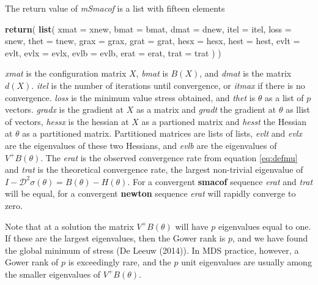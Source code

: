 \documentclass[
  12pt,
]{article}
\newenvironment{Shaded}{\begin{snugshade}}{\end{snugshade}}
\newcommand{\AttributeTok}[1]{\textcolor[rgb]{0.13,0.29,0.53}{#1}}
\newcommand{\FunctionTok}[1]{\textcolor[rgb]{0.13,0.29,0.53}{\textbf{#1}}}
\newcommand{\NormalTok}[1]{#1}
\begin{document}
The return value of \emph{mSmacof} is a list with fifteen elements

\begin{Shaded}
\begin{Highlighting}[]
    \FunctionTok{return}\NormalTok{(}
      \FunctionTok{list}\NormalTok{(}
        \AttributeTok{xmat =}\NormalTok{ xnew,}
        \AttributeTok{bmat =}\NormalTok{ bmat,}
        \AttributeTok{dmat =}\NormalTok{ dnew,}
        \AttributeTok{itel =}\NormalTok{ itel,}
        \AttributeTok{loss =}\NormalTok{ snew,}
        \AttributeTok{thet =}\NormalTok{ tnew,}
        \AttributeTok{grax =}\NormalTok{ grax,}
        \AttributeTok{grat =}\NormalTok{ grat,}
        \AttributeTok{hesx =}\NormalTok{ hesx,}
        \AttributeTok{hest =}\NormalTok{ hest,}
        \AttributeTok{evlt =}\NormalTok{ evlt,}
        \AttributeTok{evlx =}\NormalTok{ evlx,}
        \AttributeTok{evlb =}\NormalTok{ evlb,}
        \AttributeTok{erat =}\NormalTok{ erat,}
        \AttributeTok{trat =}\NormalTok{ trat}
\NormalTok{      )}
\NormalTok{    )}
\end{Highlighting}
\end{Shaded}

\emph{xmat} is the configuration matrix \(X\), \emph{bmat} is \(B(X)\), and \emph{dmat}
is the matrix \(d(X)\). \emph{itel} is the number of iterations until convergence, or
\emph{itmax} if there is no convergence. \emph{loss} is the minimum value stress obtained,
and \emph{thet} is \(\theta\) as a list of \(p\) vectors. \emph{gradx} is the gradient at \(X\)
as a matrix and \emph{gradt} the gradient at \(\theta\) as llist of vectors,
\emph{hessx} is the hessian at \(X\) as a partioned matrix and \emph{hesst} the Hessian at \(\theta\) as a partitioned matrix. Partitioned matrices are lists of lists,
\emph{evlt} and \emph{evlx} are the eigenvalues of these two Hessians, and \emph{evlb} are the eigenvalues of
\(V^+B(\theta)\). The \emph{erat} is the observed convergence rate from equation \eqref{eq:defmu} and \emph{trat} is the theoretical convergence rate, the largest non-trivial eigenvalue
of \(I-\mathcal{D}^2\sigma(\theta)=B(\theta)-H(\theta)\). For a convergent \textbf{smacof}
sequence \emph{erat} and \emph{trat} will be equal, for a convergent \textbf{newton} sequence
\emph{erat} will rapidly converge to zero.

Note that at a solution the matrix \(V^+B(\theta)\) will have \(p\) eigenvalues
equal to one. If these are the largest eigenvalues, then the Gower rank is \(p\), and
we have found the global minimum of stress (De Leeuw (2014)). In MDS practice, however,
a Gower rank of \(p\) is exceedingly rare, and the \(p\) unit eigenvalues are usually among the smaller
eigenvalues of \(V^+B(\theta)\).
\end{document}

